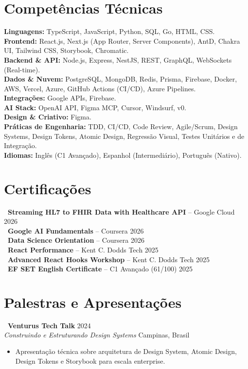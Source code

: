 \documentclass[10pt,a4paper]{article}
\begin{document}
\section{Competências Técnicas}
\noindent
\textbf{Linguagens:} TypeScript, JavaScript, Python, SQL, Go, HTML, CSS. \\
\textbf{Frontend:} React.js, Next.js (App Router, Server Components), AntD, Chakra UI, Tailwind CSS, Storybook, Chromatic. \\
\textbf{Backend \& API:} Node.js, Express, NestJS, REST, GraphQL, WebSockets (Real-time). \\
\textbf{Dados \& Nuvem:} PostgreSQL, MongoDB, Redis, Prisma, Firebase, Docker, AWS, Vercel, Azure, GitHub Actions (CI/CD), Azure Pipelines. \\
\textbf{Integrações:} Google APIs, Firebase. \\
\textbf{AI Stack:} OpenAI API, Figma MCP, Cursor, Windsurf, v0. \\
\textbf{Design \& Criativo:} Figma. \\
\textbf{Práticas de Engenharia:} TDD, CI/CD, Code Review, Agile/Scrum, Design Systems, Design Tokens, Atomic Design, Regressão Visual, Testes Unitários e de Integração. \\
\textbf{Idiomas:} Inglês (C1 Avançado), Espanhol (Intermediário), Português (Nativo).

\section{Certificações}
\noindent\textbf{\textbullet~Streaming HL7 to FHIR Data with Healthcare API} -- Google Cloud \hfill 2026 \\
\noindent\textbf{\textbullet~Google AI Fundamentals} -- Coursera \hfill 2026 \\
\noindent\textbf{\textbullet~Data Science Orientation} -- Coursera \hfill 2026 \\
\noindent\textbf{\textbullet~React Performance} -- Kent C. Dodds Tech \hfill 2025 \\
\noindent\textbf{\textbullet~Advanced React Hooks Workshop} -- Kent C. Dodds Tech \hfill 2025 \\
\noindent\textbf{\textbullet~EF SET English Certificate} -- C1 Avançado (61/100) \hfill 2025

\section{Palestras e Apresentações}
\noindent\textbf{\textbullet~Venturus Tech Talk} \hfill 2024 \\
\textit{Construindo e Estruturando Design Systems} \hfill Campinas, Brasil
\begin{itemize}[leftmargin=*,label=\textendash,itemsep=2pt,parsep=0pt,topsep=2pt]
  \item Apresentação técnica sobre arquitetura de Design System, Atomic Design, Design Tokens e Storybook para escala enterprise.
\end{itemize}
\end{document}

